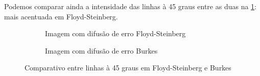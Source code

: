\documentclass[brazilian,a4paper,twocolumn]{article}
\begin{document}
        Podemos comparar ainda a intensidade das linhas à 45 graus entre as duas na \cref{fig:binarizada-floyd_steinberg-burkes-linhas}: mais acentuada em Floyd-Steinberg.

        \begin{figure}
            \centering
            \begin{subfigure}{0.24\textwidth}
                \caption{Imagem com difusão de erro Floyd-Steinberg}
            \end{subfigure}
            \begin{subfigure}{0.24\textwidth}
                \caption{Imagem com difusão de erro Burkes}
            \end{subfigure}

            \caption{Comparativo entre linhas à 45 graus em Floyd-Steinberg e Burkes}
            \label{fig:binarizada-floyd_steinberg-burkes-linhas}
        \end{figure}

\end{document}
